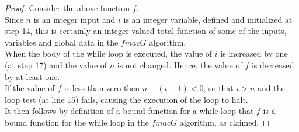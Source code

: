 \documentclass[12pt]{article}
\begin{document}
\begin{proof} Consider the above function $f$. \\

    \noindent Since $n$ is an integer input and $i$ is an integer variable, defined and 
    initialized at step 14, this is certainly an integer-valued total function of
    some of the inputs, variables and global data in the $fmacG$ algorithm. \\

    \noindent When the body of the while loop is executed, the value of $i$ is increased
    by one (at step 17) and the value of $n$ is not changed. Hence, the value of $f$ is
    decreased by at least one. \\

    \noindent If the value of $f$ is less than zero then $n-(i-1) < 0$, so that $i > n$ and the loop
    test (at line 15) fails, causing the execution of the loop to halt. \\

    \noindent It then follows by definition of a bound function for a while loop that $f$ is a bound 
    function for the while loop in the $fmacG$ algorithm, as claimed.
\end{proof}


\end{document}
